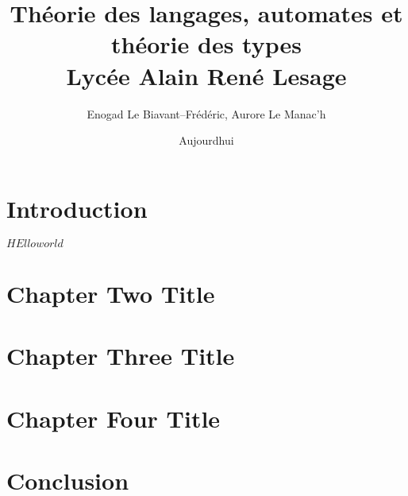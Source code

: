 \documentclass{report}
\title{
		{Théorie des langages, automates et théorie des types}\\
		{\large Lycée Alain René Lesage}\\
}
\author{Enogad Le Biavant--Frédéric, Aurore Le Manac'h}
\date{Aujourdhui}
\begin{document}
\maketitle
\tableofcontents
\chapter{Introduction}
%

$HEllo world$

\chapter{Chapter Two Title}
%

\chapter{Chapter Three Title}
%

\chapter{Chapter Four Title}
%

\chapter{Conclusion}
%
\end{document}
